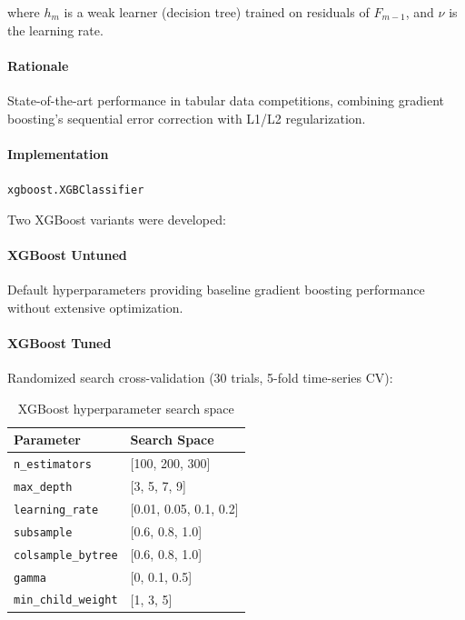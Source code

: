 \documentclass{report}
\begin{document}
where $h_m$ is a weak learner (decision tree) trained on residuals of $F_{m-1}$, and $\nu$ is the learning rate.

\paragraph{Rationale}

State-of-the-art performance in tabular data competitions, combining gradient boosting's sequential error correction with L1/L2 regularization.

\paragraph{Implementation}

\texttt{xgboost.XGBClassifier}

Two XGBoost variants were developed:

\paragraph{XGBoost Untuned}

Default hyperparameters providing baseline gradient boosting performance without extensive optimization.

\paragraph{XGBoost Tuned}

Randomized search cross-validation (30 trials, 5-fold time-series CV):

\begin{table}[h]
\centering
\caption{XGBoost hyperparameter search space}
\label{tab:xgb_hyperparams}
\begin{tabular}{ll}
\toprule
\textbf{Parameter} & \textbf{Search Space} \\
\midrule
\texttt{n\_estimators} & [100, 200, 300] \\
\texttt{max\_depth} & [3, 5, 7, 9] \\
\texttt{learning\_rate} & [0.01, 0.05, 0.1, 0.2] \\
\texttt{subsample} & [0.6, 0.8, 1.0] \\
\texttt{colsample\_bytree} & [0.6, 0.8, 1.0] \\
\texttt{gamma} & [0, 0.1, 0.5] \\
\texttt{min\_child\_weight} & [1, 3, 5] \\
\bottomrule
\end{tabular}
\end{table}
\end{document}
